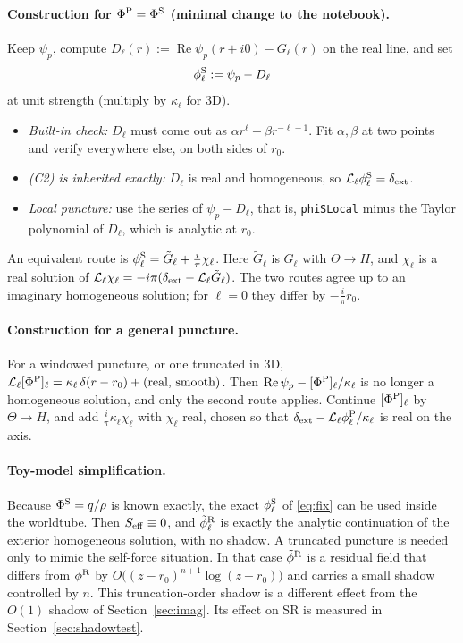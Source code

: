 \documentclass[11pt,a4paper]{article}
\renewcommand{\Re}{\operatorname{Re}}
\newcommand{\dext}{\delta_{\rm ext}}
\newcommand{\Lop}{\mathcal{L}_\ell}
\newcommand{\PhiS}{\Phi^{\rm S}}
\newcommand{\phiS}{\phi^{\rm S}}
\newcommand{\phiR}{\phi^{\rm R}}
\newcommand{\code}[1]{\texttt{#1}}
\begin{document}
\paragraph{Construction for $\Phi^{\rm P}=\PhiS$ (minimal change to the notebook).}
Keep $\psi_p$, compute $D_\ell(r):=\Re\psi_p(r+i0)-G_\ell(r)$ on the real line, and set
\begin{equation}
\phiS_\ell:=\psi_p-D_\ell
\label{eq:fix}
\end{equation}
at unit strength (multiply by $\kappa_\ell$ for 3D).
\begin{itemize}[nosep]
\item \emph{Built-in check:} $D_\ell$ must come out as $\alpha r^\ell+\beta r^{-\ell-1}$.
  Fit $\alpha,\beta$ at two points and verify everywhere else, on both sides of $r_0$.
\item \emph{(C2) is inherited exactly:} $D_\ell$ is real and homogeneous, so $\Lop\phiS_\ell=\dext$.
\item \emph{Local puncture:} use the series of $\psi_p-D_\ell$, that is, \code{phiSLocal} minus the Taylor polynomial of $D_\ell$, which is analytic at $r_0$.
\end{itemize}
An equivalent route is $\phiS_\ell=\tilde G_\ell+\frac{i}{\pi}\chi_\ell$.
Here $\tilde G_\ell$ is $G_\ell$ with $\Theta\to H$, and $\chi_\ell$ is a real solution of $\Lop\chi_\ell=-i\pi(\dext-\Lop\tilde G_\ell)$.
The two routes agree up to an imaginary homogeneous solution; for $\ell=0$ they differ by $-\frac{i}{\pi}r_0$.

\paragraph{Construction for a general puncture.}
For a windowed puncture, or one truncated in 3D, $\Lop[\Phi^{\rm P}]_\ell=\kappa_\ell\,\delta(r-r_0)+(\text{real, smooth})$.
Then $\Re\psi_p-[\Phi^{\rm P}]_\ell/\kappa_\ell$ is no longer a homogeneous solution, and only the second route applies.
Continue $[\Phi^{\rm P}]_\ell$ by $\Theta\to H$, and add $\frac{i}{\pi}\kappa_\ell\chi_\ell$ with $\chi_\ell$ real, chosen so that $\dext-\Lop\phi^{\rm P}_\ell/\kappa_\ell$ is real on the axis.

\paragraph{Toy-model simplification.}
Because $\PhiS=q/\rho$ is known exactly, the exact $\phiS_\ell$ of \eqref{eq:fix} can be used inside the worldtube.
Then $S_{\rm eff}\equiv0$, and $\tilde\phi^{\rm R}_\ell$ is exactly the analytic continuation of the exterior homogeneous solution, with no shadow.
A truncated puncture is needed only to mimic the self-force situation.
In that case $\tilde\phi^{\rm R}$ is a residual field that differs from $\phiR$ by $O\big((z-r_0)^{n+1}\log(z-r_0)\big)$ and carries a small shadow controlled by $n$.
This truncation-order shadow is a different effect from the $O(1)$ shadow of Section~\ref{sec:imag}.
Its effect on SR is measured in Section~\ref{sec:shadowtest}.
\end{document}

